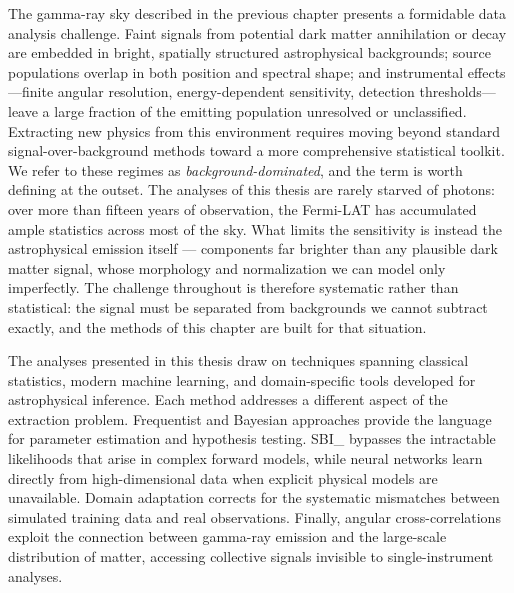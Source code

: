 
The gamma-ray sky described in the previous chapter presents a formidable data analysis challenge.
Faint signals from potential dark matter annihilation or decay are embedded in bright, spatially structured astrophysical backgrounds; source populations overlap in both position and spectral shape; and instrumental effects---finite angular resolution, energy-dependent sensitivity, detection thresholds---leave a large fraction of the emitting population unresolved or unclassified.
Extracting new physics from this environment requires moving beyond standard signal-over-background methods toward a more comprehensive statistical toolkit.
We refer to these regimes as \emph{background-dominated}, and the term is worth defining at the outset.
The analyses of this thesis are rarely starved of photons: over more than fifteen years of observation, the Fermi-LAT has accumulated ample statistics across most of the sky.
What limits the sensitivity is instead the astrophysical emission itself --- components far brighter than any plausible dark matter signal, whose morphology and normalization we can model only imperfectly.
The challenge throughout is therefore systematic rather than statistical: the signal must be separated from backgrounds we cannot subtract exactly, and the methods of this chapter are built for that situation.

The analyses presented in this thesis draw on techniques spanning classical statistics, modern machine learning, and domain-specific tools developed for astrophysical inference.
Each method addresses a different aspect of the extraction problem.
Frequentist and Bayesian approaches provide the language for parameter estimation and hypothesis testing.
\Gls{SBI_} bypasses the intractable likelihoods that arise in complex forward models, while neural networks learn directly from high-dimensional data when explicit physical models are unavailable.
Domain adaptation corrects for the systematic mismatches between simulated training data and real observations.
Finally, angular cross-correlations exploit the connection between gamma-ray emission and the large-scale distribution of matter, accessing collective signals invisible to single-instrument analyses.

